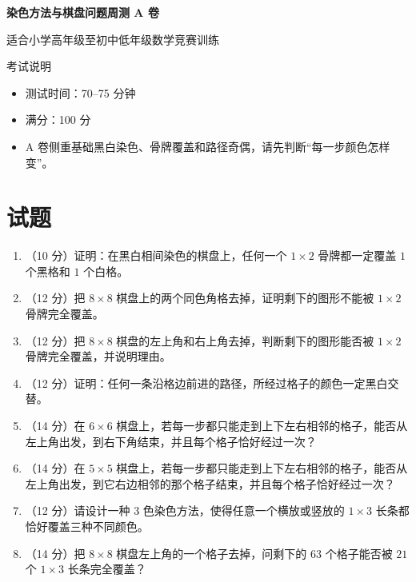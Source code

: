 \documentclass[11pt,a4paper,fontset=fandol]{ctexart}
\newcommand{\answerspace}{\vspace{2.3cm}}
\newcommand{\biganswerspace}{\vspace{3.1cm}}
\begin{document}
\thispagestyle{empty}
\begin{center}
{\fontsize{22}{28}\selectfont\bfseries 染色方法与棋盘问题周测 A 卷\par}
\vspace{0.4cm}
{\large 适合小学高年级至初中低年级数学竞赛训练\par}
\end{center}

\begin{infobox}{考试说明}
\begin{itemize}
  \item 测试时间：70--75 分钟
  \item 满分：100 分
  \item A 卷侧重基础黑白染色、骨牌覆盖和路径奇偶，请先判断“每一步颜色怎样变”。
\end{itemize}
\end{infobox}

\section{试题}

\begin{enumerate}
  \item （10 分）证明：在黑白相间染色的棋盘上，任何一个 $1\times 2$ 骨牌都一定覆盖 $1$ 个黑格和 $1$ 个白格。
  \answerspace

  \item （12 分）把 $8\times 8$ 棋盘上的两个同色角格去掉，证明剩下的图形不能被 $1\times 2$ 骨牌完全覆盖。
  \answerspace

  \item （12 分）把 $8\times 8$ 棋盘的左上角和右上角去掉，判断剩下的图形能否被 $1\times 2$ 骨牌完全覆盖，并说明理由。
  \answerspace

  \item （12 分）证明：任何一条沿格边前进的路径，所经过格子的颜色一定黑白交替。
  \answerspace

  \item （14 分）在 $6\times 6$ 棋盘上，若每一步都只能走到上下左右相邻的格子，能否从左上角出发，到右下角结束，并且每个格子恰好经过一次？
  \biganswerspace

  \item （14 分）在 $5\times 5$ 棋盘上，若每一步都只能走到上下左右相邻的格子，能否从左上角出发，到它右边相邻的那个格子结束，并且每个格子恰好经过一次？
  \biganswerspace

  \item （12 分）请设计一种 $3$ 色染色方法，使得任意一个横放或竖放的 $1\times 3$ 长条都恰好覆盖三种不同颜色。
  \answerspace

  \item （14 分）把 $8\times 8$ 棋盘左上角的一个格子去掉，问剩下的 $63$ 个格子能否被 $21$ 个 $1\times 3$ 长条完全覆盖？
  \biganswerspace
\end{enumerate}
\end{document}
